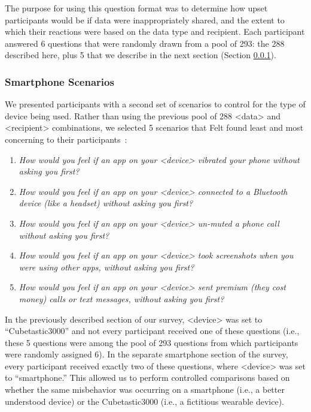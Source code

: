 The purpose for using this question format was to determine how upset participants would be if data were inappropriately shared, and the extent to which their reactions were based on the data type and recipient. Each participant answered 6 questions that were randomly drawn from a pool of 293: the 288 described here, plus 5 that we describe in the next section (Section \ref{sec:smartphones}).

\subsubsection{Smartphone Scenarios}
\label{sec:smartphones}
We presented participants with a second set of scenarios to control for the type of device being used. Rather than using the previous pool of 288 <data> and <recipient> combinations, we selected 5 scenarios that Felt \etal found least and most concerning to their participants~\cite{Felt}:

\begin{enumerate}[topsep=0pt,itemsep=-1ex,partopsep=1ex,parsep=1ex]
\item {\it How would you feel if an app on your <device> vibrated your phone without asking you first?}
\item {\it How would you feel if an app on your <device> connected to a Bluetooth device (like a headset) without asking you first?}
\item {\it How would you feel if an app on your <device> un-muted a phone call without asking you first?}
\item {\it How would you feel if an app on your <device> took screenshots when you were using other apps, without asking you first?}
\item {\it How would you feel if an app on your <device> sent premium (they cost money) calls or text messages, without asking you first?}
\end{enumerate}


In the previously described section of our survey, <device> was set to ``Cubetastic3000'' and not every participant received one of these questions (i.e., these 5 questions were among the pool of 293 questions from which participants were randomly assigned 6). In the separate smartphone section of the survey, every participant received exactly two of these questions, where <device> was set to ``smartphone.'' This allowed us to perform controlled comparisons based on whether the same misbehavior was occurring on a smartphone (i.e., a better understood device) or the Cubetastic3000 (i.e., a fictitious wearable device).

